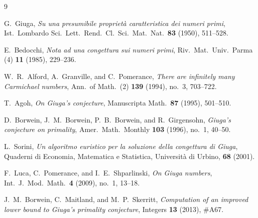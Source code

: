 \documentclass[11pt]{amsart}
\theoremstyle{definition}
\theoremstyle{remark}
\numberwithin{equation}{section}
\begin{document}
\begin{thebibliography}{9}

G.~Giuga,
\emph{Su una presumibile propriet\`a caratteristica dei numeri primi},
Ist.\ Lombardo Sci.\ Lett.\ Rend.\ Cl.\ Sci.\ Mat.\ Nat.\ \textbf{83} (1950), 511--528.

E.~Bedocchi,
\emph{Nota ad una congettura sui numeri primi},
Riv.\ Mat.\ Univ.\ Parma (4) \textbf{11} (1985), 229--236.

W.~R.~Alford, A.~Granville, and C.~Pomerance,
\emph{There are infinitely many Carmichael numbers},
Ann.\ of Math.\ (2) \textbf{139} (1994), no.~3, 703--722.

T.~Agoh,
\emph{On Giuga's conjecture},
Manuscripta Math.\ \textbf{87} (1995), 501--510.

D.~Borwein, J.~M.~Borwein, P.~B.~Borwein, and R.~Girgensohn,
\emph{Giuga's conjecture on primality},
Amer.\ Math.\ Monthly \textbf{103} (1996), no.~1, 40--50.

L.~Sorini,
\emph{Un algoritmo euristico per la soluzione della congettura di Giuga},
Quaderni di Economia, Matematica e Statistica, Universit\`a di Urbino, \textbf{68} (2001).

F.~Luca, C.~Pomerance, and I.~E.~Shparlinski,
\emph{On Giuga numbers},
Int.\ J.\ Mod.\ Math.\ \textbf{4} (2009), no.~1, 13--18.

J.~M.~Borwein, C.~Maitland, and M.~P.~Skerritt,
\emph{Computation of an improved lower bound to Giuga's primality conjecture},
Integers \textbf{13} (2013), \#A67.

\end{thebibliography}
\end{document}
